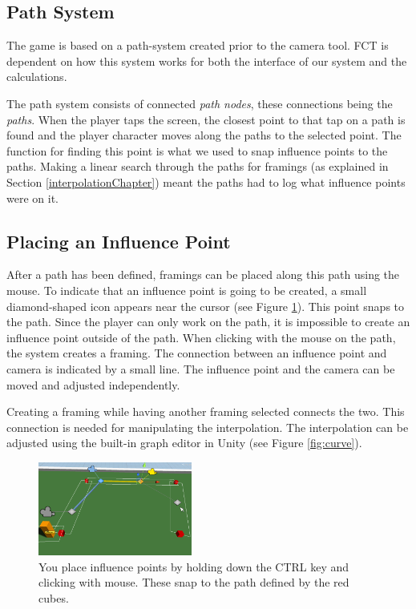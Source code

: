 \subsection{Path System}
The game is based on a path-system created prior to the camera tool. FCT is dependent on how this system works for both the interface of our system and the calculations.

The path system consists of connected \textit{path nodes}, these connections being the \textit{paths}. When the player taps the screen, the closest point to that tap on a path is found and the player character moves along the paths to the selected point. The function for finding this point is what we used to snap influence points to the paths. Making a linear search through the paths for framings (as explained in Section \ref{interpolationChapter}) meant the paths had to log what influence points were on it.

\subsection{Placing an Influence Point}
After a path has been defined, framings can be placed along this path using the mouse. To indicate that an influence point is going to be created, a small diamond-shaped icon appears near the cursor (see Figure \ref{fig:placingInfluencePoint}). This point snaps to the path. Since the player can only work on the path, it is impossible to create an influence point outside of the path. When clicking with the mouse on the path, the system creates a framing. The connection between an influence point and camera is indicated by a small line. The influence point and the camera can be moved and adjusted independently.

Creating a framing while having another framing selected connects the two. This connection is needed for manipulating the interpolation. The interpolation can be adjusted using the built-in graph editor in Unity (see Figure \ref{fig:curve}).

\begin{figure}[htbp]
\centering
\includegraphics[width=0.45\textwidth]{Pics/placingInfluencePoint}
\caption{You place influence points by holding down the CTRL key and clicking with mouse. These snap to the path defined by the red cubes.}
\label{fig:placingInfluencePoint}
\end{figure}

